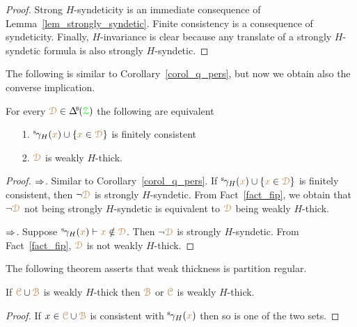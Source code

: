 \begin{proof}
  Strong $H$-syndeticity is an immediate consequence of Lemma~\ref{lem_strongly_syndetic}.
  Finite consistency is a consequence of syndeticity.
  Finally, $H$-invariance is clear because any translate of a strongly $H$-syndetic formula is also strongly $H$-syndetic.
\end{proof}

The following is similar to Corollary~\ref{corol_q_pers}, but now we obtain also the converse implication.

\begin{corollary}\label{corol_q_w_pers}
  For every $\mrD\in\BDelta(\grZ)$ the following are equivalent
  \begin{itemize}
    \item [1.] ${}^{\rm s}\kern-.2ex\gamma_H({\color{brown} x})\cup\{{\color{brown} x}\in{\color{brown}\EuScript D}\}$ is finitely consistent
    \item [2.] ${\color{brown}\EuScript D}$ is weakly $H$-thick.
  \end{itemize}
\end{corollary}

\begin{proof}
  $\Rightarrow$. 
  Similar to Corollary~\ref{corol_q_pers}.
  If ${}^{\rm s}\kern-.2ex\gamma_H({\color{brown} x})\cup\{{\color{brown} x}\in{\color{brown}\EuScript D}\}$ is finitely consistent, then $\neg{\color{brown}\EuScript D}$ is strongly $H$-syndetic.
  From Fact~\ref{fact_fip}, we obtain that $\neg{\color{brown}\EuScript D}$ not being strongly $H$-syndetic is equivalent to ${\color{brown}\EuScript D}$ being weakly $H$-thick.

  $\Rightarrow$.
  Suppose ${}^{\rm s}\kern-.2ex\gamma_H({\color{brown} x})\vdash{\color{brown}x}\notin{\color{brown}\EuScript D}$.
  Then $\neg{\color{brown}\EuScript D}$ is strongly $H$-syndetic.
  From Fact~\ref{fact_fip}, ${\color{brown}\EuScript D}$ is not weakly $H$-thick.
\end{proof}

The following theorem asserts that weak thickness is partition regular.

\begin{theorem}\label{thm_wt_partreg}
  If ${\color{brown}\EuScript C}\cup{\color{brown}\EuScript B}$ is weakly $H$-thick then ${\color{brown}\EuScript B}$ or ${\color{brown}\EuScript C}$ is weakly $H$-thick.
\end{theorem}

\begin{proof}
  If $x\in {\color{brown}\EuScript C}\cup{\color{brown}\EuScript B}$ is consistent with ${}^{\rm s}\kern-.2ex\gamma_H({\color{brown} x})$ then so is one of the two sets.
\end{proof}


